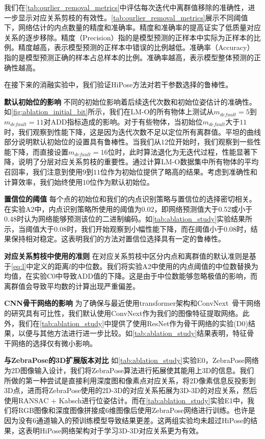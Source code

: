 我们在\autoref{tab:ourlier_removal_metrics}中评估每次迭代中离群值移除的准确性，进一步显示对应关系剪枝的有效性。\autoref{tab:ourlier_removal_metrics}展示不同阈值下，网络估计的内点数量的精度和准确率。精度和准确率的提高证实了低质量对应关系的逐步移除。精度（Precision）指的是模型预测的正样本中实际为正样本的比例。精度越高，表示模型预测的正样本中错误的比例越低。准确率（Accuracy）指的是模型预测正确的样本占总样本的比例。准确率越高，表示模型整体预测的正确性越高。



在接下来的消融实验中，我们验证HiPose方法对若干参数选择的鲁棒性。



\textbf{默认初始位的影响 }不同的初始位影响着后续迭代次数和初始位姿估计的准确性。
如\autoref{fig:ablation_initial_bit}所示，我们在LM-O的所有物体上测试从$m_{default} = 5$到$m_{default}=11$对ADD指标造成的影响。对于有些物体，当初始位$m_{default}$大于$11$时，我们观察到性能下降，这是因为迭代次数不足以定位所有离群值。平坦的曲线部分说明默认初始位的设置具有鲁棒性。当我们从$12$位开始时，我们观察到一些性能下降，而直接设置$m_{default} = 16$位时，此时算法退化为无迭代过程，性能显著下降，说明了分层对应关系剪枝的重要性。通过计算LM-O数据集中所有物体的平均召回率，我们注意到使用$9$到$11$位作为初始位提供了略高的结果。考虑到准确性和计算效率，我们始终使用$10$位作为默认初始位。

\textbf{置信位的阈值 }
每个点的初始位和我们的内点识别策略与置信位的选择密切相关。在实验A2中，内点识别策略所使用的阈值为$0.02$，即网络预测值大于0.52或小于0.48时认为网络能够预测该位的二进制编码。如\autoref{tab:ablation_study}实验结果所示，当阈值大于$0.08$时，我们开始观察到小幅性能下降，而在阈值小于$0.08$时，结果保持相对稳定。这表明我们的方法对置信位选择具有一定的鲁棒性。

\textbf{对应关系剪枝中使用的准则 }
在对应关系剪枝中区分内点和离群值的默认准则是基于\autoref{eq:l}中定义的距离$l$的中位数。我们将实验A2中使用的内点阈值的中位数替换为均值，在实验C0中导致ADD值的下降。这是由于中位数能够忽略极值的影响，而离群值会导致平均数的计算出现严重偏差。

\textbf{CNN骨干网络的影响 }
为了确保与最近使用transformer架构和ConvNext~\cite{Liu2022ACF}骨干网络的研究具有可比性，我们默认使用ConvNext作为我们的图像特征提取网络。此外，我们在\autoref{tab:ablation_study}中提供了使用ResNet作为骨干网络的实验(D0)结果，以便与其他方法进行进一步比较。如\autoref{tab:ablation_study}结果表明，特征骨干网络的选择仅有微小影响。

\textbf{与ZebraPose的3D扩展版本对比 }
如\autoref{tab:ablation_study}实验E0，ZebraPose网络为2D图像输入设计，我们将ZebraPose算法进行拓展使其能用上3D的信息。我们所做的第一种尝试是直接利用深度图和像素点对应关系，将2D像素信息反投影到3D点，进而将ZebraPose使用的2D-3D的对应关系拓展为3D-3D的对应关系，然后使用RANSAC + Kabsch进行位姿估计。而在\autoref{tab:ablation_study}实验E1中，我们将RGB图像和深度图像拼接成6维图像后使用ZebraPose网络进行训练。也许是因为没有6通道输入的预训练模型导致结果更差。这两组实验均未超过HiPose的结果，这表明HiPose网络架构对于学习3D-3D对应关系更为有效。

